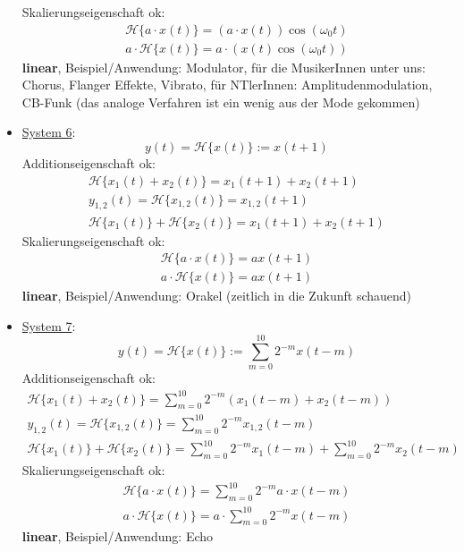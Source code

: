 \documentclass[11pt,a4paper,DIV=12]{scrartcl}
\numberwithin{equation}{section}
\numberwithin{figure}{section}
\newcommand{\sysH}[1]{\mathcal{H}{\{#1\}}}
\begin{document}
\begin{Loesung}
\begin{itemize}
Skalierungseigenschaft ok:
\begin{align}
\sysH{a \cdot x(t)}= (a \cdot x(t)) \cos(\omega_0 t)\\
a \cdot \sysH{x(t)}= a \cdot (x(t) \cos(\omega_0 t))
\end{align}
\textbf{linear}, Beispiel/Anwendung: Modulator, für die MusikerInnen unter uns:
Chorus, Flanger Effekte, Vibrato, für NTlerInnen: Amplitudenmodulation, CB-Funk
(das analoge Verfahren ist ein wenig aus der Mode gekommen)
\item  \underline{System 6}:
\begin{equation}
y(t) = \sysH{x(t)}:= x(t+1)
\end{equation}
Additionseigenschaft ok:
\begin{align}
\sysH{x_1(t)+x_2(t)} = x_1(t+1) + x_2(t+1)\\
y_{1,2}(t) = \sysH{x_{1,2}(t)}= x_{1,2}(t+1)\\
\sysH{x_1(t)} + \sysH{x_2(t)} = x_1(t+1) + x_2(t+1)
\end{align}
Skalierungseigenschaft ok:
\begin{align}
\sysH{a \cdot x(t)}= a x(t+1)\\
a \cdot \sysH{x(t)}= a x(t+1)
\end{align}
\textbf{linear}, Beispiel/Anwendung: Orakel (zeitlich in die Zukunft schauend)
\item  \underline{System 7}:
\begin{equation}
y(t) = \sysH{x(t)}:= \sum_{m=0}^{10} 2^{-m} x(t-m)
\end{equation}
Additionseigenschaft ok:
\begin{align}
\sysH{x_1(t)+x_2(t)}=\sum_{m=0}^{10} 2^{-m} (x_1(t-m)+x_2(t-m))\\
y_{1,2}(t) = \sysH{x_{1,2}(t)}= \sum_{m=0}^{10} 2^{-m} x_{1,2}(t-m)\\
\sysH{x_1(t)} + \sysH{x_2(t)} = \sum_{m=0}^{10} 2^{-m} x_1(t-m) + \sum_{m=0}^{10} 2^{-m} x_2(t-m)
\end{align}
Skalierungseigenschaft ok:
\begin{align}
\sysH{a \cdot x(t)}= \sum_{m=0}^{10} 2^{-m} a \cdot x(t-m)\\
a \cdot \sysH{x(t)}= a \cdot \sum_{m=0}^{10} 2^{-m} x(t-m)
\end{align}
\textbf{linear}, Beispiel/Anwendung: Echo

\end{itemize}
\end{Loesung}
\end{document}
